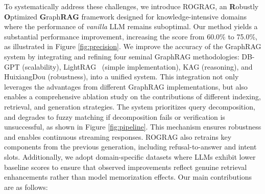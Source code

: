 \documentclass[11pt]{article}
\begin{document}
To systematically address these challenges, we introduce ROGRAG, an \textbf{R}obustly \textbf{O}ptimized \textbf{G}raph\textbf{RAG} framework designed for knowledge-intensive domains where the performance of \textit{vanilla} LLM remains suboptimal. Our method yields a substantial performance improvement, increasing the score from 60.0\% to 75.0\%, as illustrated in Figure \ref{fig:precision}. We improve the accuracy of the GraphRAG system by integrating and refining four seminal GraphRAG methodologies: DB-GPT \citep{xue2023db} (scalability), LightRAG~\citep{guo2024lightragsimplefastretrievalaugmented} (simple implementation), KAG \citep{liang2024kagboostingllmsprofessional} (reasoning), and HuixiangDou \citep{kong2024huixiangdou} (robustness), into a unified system. This integration not only leverages the advantages from different GraphRAG implementations, but also enables a comprehensive ablation study on the contributions of different indexing, retrieval, and generation strategies. 
The system prioritizes query decomposition, and degrades to fuzzy matching if decomposition fails or verification is unsuccessful, as shown in Figure \ref{fig:pipeline}. This mechanism ensures robustness and enables continuous streaming responses. ROGRAG also retrains key components from the previous generation, including refusal-to-answer and intent slots. Additionally, we adopt domain-specific datasets where LLMs exhibit lower baseline scores to ensure that observed improvements reflect genuine retrieval enhancements rather than model memorization effects. Our main contributions are as follows:
\end{document}
